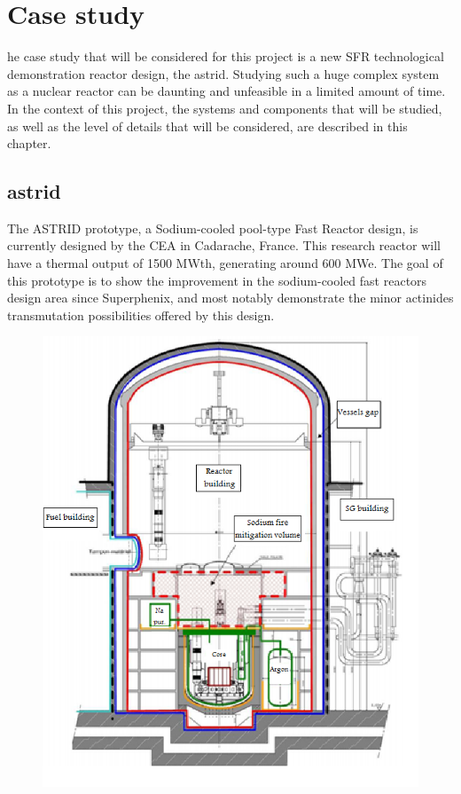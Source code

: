 %
%
\let\textcircled=\pgftextcircled
\chapter{Case study}
\label{chap:case_study}

he case study that will be considered for this project is a new SFR technological demonstration reactor design, the \gls{astrid}. Studying such a huge complex system as a nuclear reactor can be daunting and unfeasible in a limited amount of time. In the context of this project, the systems and components that will be studied, as well as the level of details that will be considered, are described in this chapter.


\section{\gls{astrid}}
\label{sec2:astrid}

The ASTRID prototype, a Sodium-cooled pool-type Fast Reactor design, is currently designed by the CEA in Cadarache, France. This research reactor will have a thermal output of 1500 MWth, generating around 600 MWe. The goal of this prototype is to show the improvement in the sodium-cooled fast reactors design area since Superphenix, and most notably demonstrate the minor actinides transmutation possibilities offered by this design.


\begin{figure}[t!]
	\centering
	\includegraphics[height=0.75\textheight]{fig02/astrid_simplified}
	\label{fig:c2f1}
\end{figure}

